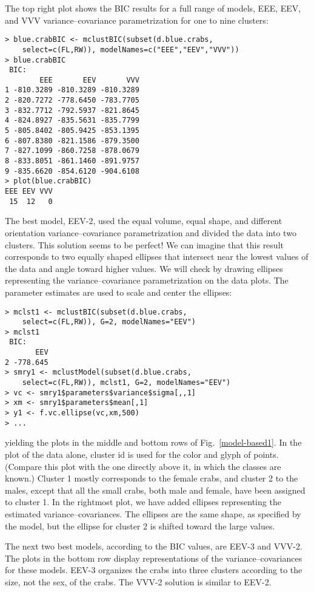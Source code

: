 The top right plot shows the BIC results for a full range of models,
EEE, EEV, and VVV variance--covariance parametrization for one to nine
clusters:

\begin{verbatim}
> blue.crabBIC <- mclustBIC(subset(d.blue.crabs,
    select=c(FL,RW)), modelNames=c("EEE","EEV","VVV"))
> blue.crabBIC
 BIC:
        EEE       EEV       VVV
1 -810.3289 -810.3289 -810.3289
2 -820.7272 -778.6450 -783.7705
3 -832.7712 -792.5937 -821.8645
4 -824.8927 -835.5631 -835.7799
5 -805.8402 -805.9425 -853.1395
6 -807.8380 -821.1586 -879.3500
7 -827.1099 -860.7258 -878.0679
8 -833.8051 -861.1460 -891.9757
9 -835.6620 -854.6120 -904.6108
> plot(blue.crabBIC)
EEE EEV VVV 
 15  12   0 
\end{verbatim}

\noindent  The best model, EEV-2, used the equal volume, equal shape,
and different orientation variance--covariance parametrization and
divided the data into two clusters. This solution seems to be perfect!
We can imagine that this result corresponds to two equally shaped
ellipses that intersect near the lowest values of the data and angle
toward higher values. We will check by drawing ellipses representing
the variance--covariance parametrization on the data plots. The
parameter estimates are used to scale and center the ellipses:

\begin{verbatim}
> mclst1 <- mclustBIC(subset(d.blue.crabs,
    select=c(FL,RW)), G=2, modelNames="EEV")
> mclst1
 BIC:
       EEV
2 -778.645
> smry1 <- mclustModel(subset(d.blue.crabs,
    select=c(FL,RW)), mclst1, G=2, modelNames="EEV")
> vc <- smry1$parameters$variance$sigma[,,1]
> xm <- smry1$parameters$mean[,1]
> y1 <- f.vc.ellipse(vc,xm,500)
> ...
\end{verbatim}

\noindent yielding the plots in the middle and bottom rows of
Fig.~\ref{model-based1}.  In the plot of the data alone, cluster id is
used for the color and glyph of points.  (Compare this plot with the one
directly above it, in which the classes are known.)  Cluster 1 mostly
corresponds to the female crabs, and cluster 2 to the males, except
that all the small crabs, both male and female, have been assigned to
cluster 1. In the rightmost plot, we have added ellipses representing
the estimated variance--covariances. The ellipses are the same shape,
as specified by the model, but the ellipse for cluster 2 is shifted
toward the large values.

The next two best models, according to the BIC values, are EEV-3 and
VVV-2.  The plots in the bottom row display representations of the
variance--covariances for these models. EEV-3 organizes the crabs into
three clusters according to the size, not the sex, of the crabs. The
VVV-2 solution is similar to EEV-2.

